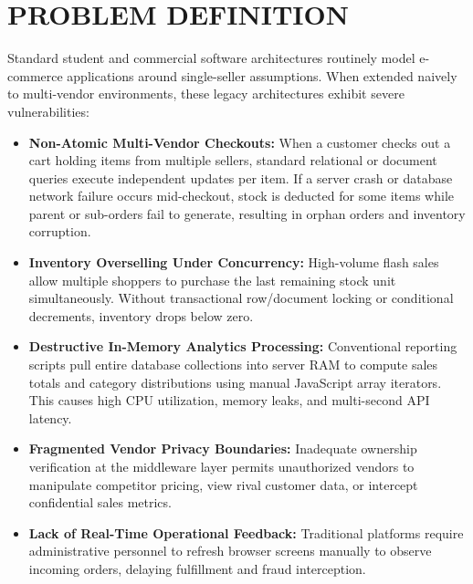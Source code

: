 \documentclass[12pt,a4paper]{report}
\begin{document}
\section{PROBLEM DEFINITION}
Standard student and commercial software architectures routinely model e-commerce applications around single-seller assumptions. When extended naively to multi-vendor environments, these legacy architectures exhibit severe vulnerabilities:
\begin{itemize}[leftmargin=1.5cm]
    \item \textbf{Non-Atomic Multi-Vendor Checkouts:} When a customer checks out a cart holding items from multiple sellers, standard relational or document queries execute independent updates per item. If a server crash or database network failure occurs mid-checkout, stock is deducted for some items while parent or sub-orders fail to generate, resulting in orphan orders and inventory corruption.
    \item \textbf{Inventory Overselling Under Concurrency:} High-volume flash sales allow multiple shoppers to purchase the last remaining stock unit simultaneously. Without transactional row/document locking or conditional decrements, inventory drops below zero.
    \item \textbf{Destructive In-Memory Analytics Processing:} Conventional reporting scripts pull entire database collections into server RAM to compute sales totals and category distributions using manual JavaScript array iterators. This causes high CPU utilization, memory leaks, and multi-second API latency.
    \item \textbf{Fragmented Vendor Privacy Boundaries:} Inadequate ownership verification at the middleware layer permits unauthorized vendors to manipulate competitor pricing, view rival customer data, or intercept confidential sales metrics.
    \item \textbf{Lack of Real-Time Operational Feedback:} Traditional platforms require administrative personnel to refresh browser screens manually to observe incoming orders, delaying fulfillment and fraud interception.
\end{itemize}
\end{document}
